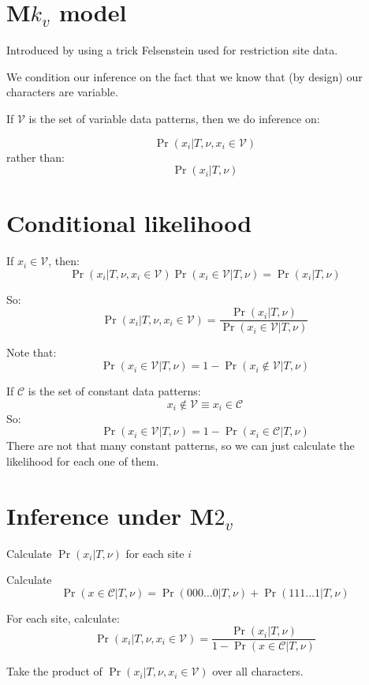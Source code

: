 \documentclass[landscape]{foils}
\begin{document}
\myNewSlide
\section*{M$k_v$ model}
Introduced by \citet{Lewis2001} using a trick Felsenstein used for restriction site data.

We condition our inference on the fact that we know that (by design) our characters are variable.

If ${\mathcal V}$ is the set of variable data patterns, then we do inference on:

$$ \Pr(x_i|T,\nu, x_i\in {\mathcal V}) $$
rather than:
$$ \Pr(x_i|T,\nu) $$

\myNewSlide
\section*{Conditional likelihood}

If $x_i\in {\mathcal V}$, then:
$$  \Pr(x_i|T,\nu, x_i\in {\mathcal V}) \Pr(x_i\in {\mathcal V} |T,\nu) = \Pr(x_i|T,\nu)  $$

So:
$$ \Pr(x_i|T,\nu, x_i\in {\mathcal V}) = \frac{\Pr(x_i|T,\nu)}{\Pr(x_i\in {\mathcal V} |T,\nu)}$$


\myNewSlide
Note that:
$$\Pr(x_i\in {\mathcal V} |T,\nu) = 1 - \Pr(x_i\notin {\mathcal V} |T,\nu)$$

If $ {\mathcal C}$ is the set of constant data patterns:
$$x_i\notin {\mathcal V} \equiv x_i\in {\mathcal C}$$
So:
$$\Pr(x_i\in {\mathcal V} |T,\nu) = 1 - \Pr(x_i\in {\mathcal C} |T,\nu)$$
There are not that many constant patterns, so we can just calculate the likelihood for each one of them.

\myNewSlide
\section*{Inference under M$2_v$}
\begin{compactenum}
	\item Calculate $\Pr(x_i|T,\nu)$ for each site $i$
	\item Calculate $$\Pr(x\in{\mathcal C}|T,\nu) = \Pr(000\ldots0 |T,\nu) + \Pr(111\ldots1 |T,\nu)$$
	\item For each site, calculate:
		$$ \Pr(x_i|T,\nu, x_i\in{\mathcal V}) = \frac{\Pr(x_i|T,\nu)}{1 - \Pr(x\in{\mathcal C}|T,\nu)} $$
	\item Take the product of $\Pr(x_i|T,\nu, x_i\in{\mathcal V})$ over all characters.
\end{compactenum}
\end{document}
